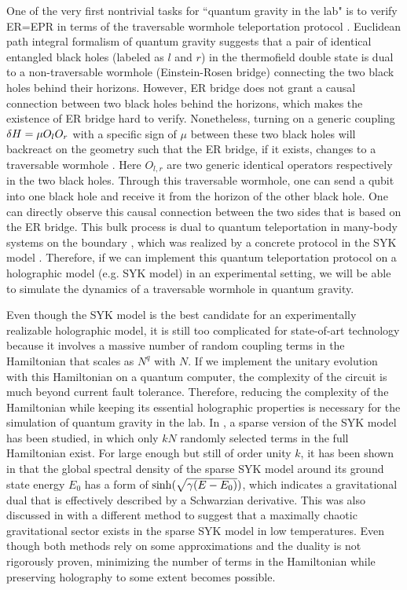 \documentclass[11pt]{article}
\renewcommand{\>}{\rangle}
\newcommand{\<}{\langle}
\begin{document}
One of the very first nontrivial tasks for ``quantum gravity in the lab" is to verify ER=EPR \cite{Maldacena:2013xja} in terms of the traversable wormhole teleportation protocol \cite{Gao:2019nyj}. Euclidean path integral formalism of quantum gravity suggests that a pair of identical entangled black holes (labeled as $l$ and $r$) in the thermofield double state is dual to a non-traversable wormhole (Einstein-Rosen bridge) connecting the two black holes behind their horizons. However, ER bridge does not grant a causal connection between two black holes behind the horizons, which makes the existence of ER bridge hard to verify. Nonetheless, turning on a generic coupling $\delta H=\mu O_l O_r$ with a specific sign of $\mu$ between these two black holes will backreact on the geometry such that the ER bridge, if it exists, changes to a traversable wormhole \cite{Gao:2016bin}. Here $O_{l,r}$ are two generic identical operators respectively in the two black holes. Through this traversable wormhole, one can send a qubit into one black hole and receive it from the horizon of the other black hole. One can directly observe this causal connection between the two sides that is based on the ER bridge. This bulk process is dual to quantum teleportation in many-body systems on the boundary \cite{Gao:2016bin}, which was realized by a concrete protocol in the SYK model \cite{Gao:2019nyj}. Therefore, if we can implement this quantum teleportation protocol on a holographic model (e.g. SYK model) in an experimental setting, we will be able to simulate the dynamics of a traversable wormhole in quantum gravity.

Even though the SYK model is the best candidate for an experimentally realizable holographic model, it is still too complicated for state-of-art technology because it involves a massive number of random coupling terms in the Hamiltonian that scales as $N^q$ with $N$. If we implement the unitary evolution with this Hamiltonian on a quantum computer, the complexity of the circuit is much beyond current fault tolerance. Therefore, reducing the complexity of the Hamiltonian while keeping its essential holographic properties is necessary for the simulation of quantum gravity in the lab. In \cite{Garcia-Garcia:2020cdo,Xu:2020shn}, a sparse version of the SYK model has been studied, in which only $k N$ randomly selected terms in the full Hamiltonian exist. For large enough but still of order unity $k$, it has been shown in \cite{Garcia-Garcia:2020cdo} that the global spectral density of the sparse SYK model around its ground state energy $E_0$ has a form of $\sinh(\sqrt{\gamma (E-E_0)})$, which indicates a gravitational dual that is effectively described by a Schwarzian derivative. This was also discussed in \cite{Xu:2020shn} with a different method to suggest that a maximally chaotic gravitational sector exists in the sparse SYK model in low temperatures. Even though both methods rely on some approximations and the duality is not rigorously proven, minimizing the number of terms in the Hamiltonian while preserving holography to some extent becomes possible.
\end{document}
